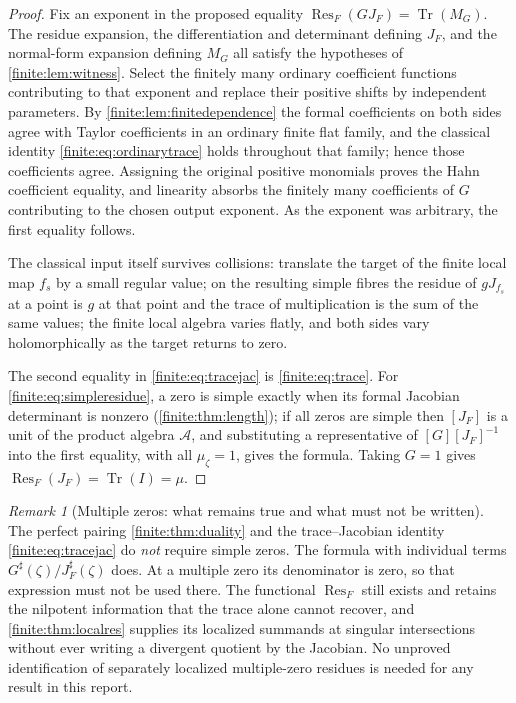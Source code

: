 \documentclass[11pt,letterpaper]{article}
\theoremstyle{definition}
\theoremstyle{remark}
\newtheorem{remark}[theorem]{Remark}
\newcommand{\Alg}{\mathcal A}
\newcommand{\sh}{^{\sharp}}
\DeclareMathOperator{\Res}{Res}
\DeclareMathOperator{\Tr}{Tr}
\numberwithin{equation}{section}
\begin{document}
\begin{proof}
Fix an exponent in the proposed equality $\Res_F(GJ_F)=\Tr(M_G)$. The residue expansion, the differentiation and determinant defining $J_F$, and the normal-form expansion defining $M_G$ all satisfy the hypotheses of \cref{finite:lem:witness}. Select the finitely many ordinary coefficient functions contributing to that exponent and replace their positive shifts by independent parameters. By \cref{finite:lem:finitedependence} the formal coefficients on both sides agree with Taylor coefficients in an ordinary finite flat family, and the classical identity \eqref{finite:eq:ordinarytrace} holds throughout that family; hence those coefficients agree. Assigning the original positive monomials proves the Hahn coefficient equality, and linearity absorbs the finitely many coefficients of $G$ contributing to the chosen output exponent. As the exponent was arbitrary, the first equality follows.

The classical input itself survives collisions: translate the target of the finite local map $f_s$ by a small regular value; on the resulting simple fibres the residue of $gJ_{f_s}$ at a point is $g$ at that point and the trace of multiplication is the sum of the same values; the finite local algebra varies flatly, and both sides vary holomorphically as the target returns to zero.

The second equality in \eqref{finite:eq:tracejac} is \eqref{finite:eq:trace}. For \eqref{finite:eq:simpleresidue}, a zero is simple exactly when its formal Jacobian determinant is nonzero (\cref{finite:thm:length}); if all zeros are simple then $[J_F]$ is a unit of the product algebra $\Alg$, and substituting a representative of $[G][J_F]^{-1}$ into the first equality, with all $\mu_\zeta=1$, gives the formula. Taking $G=1$ gives $\Res_F(J_F)=\Tr(I)=\mu$.
\end{proof}

\begin{remark}[Multiple zeros: what remains true and what must not be written]
\label{finite:rem:multiple}
The perfect pairing \cref{finite:thm:duality} and the trace--Jacobian identity \eqref{finite:eq:tracejac} do \emph{not} require simple zeros. The formula with individual terms $G\sh(\zeta)/J_F\sh(\zeta)$ does. At a multiple zero its denominator is zero, so that expression must not be used there. The functional $\Res_F$ still exists and retains the nilpotent information that the trace alone cannot recover, and \cref{finite:thm:localres} supplies its localized summands at singular intersections without ever writing a divergent quotient by the Jacobian. No unproved identification of separately localized multiple-zero residues is needed for any result in this report.
\end{remark}
\end{document}
